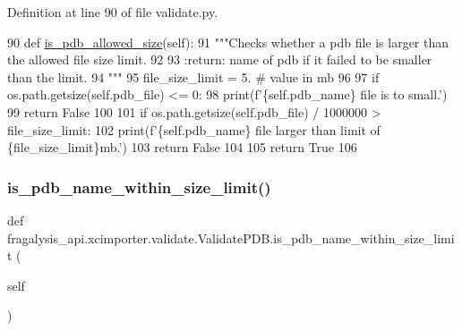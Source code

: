 Definition at line 90 of file validate.\+py.


\begin{DoxyCode}
90     \textcolor{keyword}{def }\hyperlink{classfragalysis__api_1_1xcimporter_1_1validate_1_1_validate_p_d_b_a9e9a8abbb1d90bb2cd17702178831f93}{is\_pdb\_allowed\_size}(self):
91         \textcolor{stringliteral}{"""Checks whether a pdb file is larger than the allowed file size limit.}
92 \textcolor{stringliteral}{}
93 \textcolor{stringliteral}{        :return: name of pdb if it failed to be smaller than the limit.}
94 \textcolor{stringliteral}{        """}
95         file\_size\_limit = 5.  \textcolor{comment}{# value in mb}
96 
97         \textcolor{keywordflow}{if} os.path.getsize(self.pdb\_file) <= 0:
98             print(f\textcolor{stringliteral}{'\{self.pdb\_name\} file is to small.'})
99             \textcolor{keywordflow}{return} \textcolor{keyword}{False}
100 
101         \textcolor{keywordflow}{if} os.path.getsize(self.pdb\_file) / 1000000 > file\_size\_limit:
102             print(f\textcolor{stringliteral}{'\{self.pdb\_name\} file larger than limit of \{file\_size\_limit\}mb.'})
103             \textcolor{keywordflow}{return} \textcolor{keyword}{False}
104 
105         \textcolor{keywordflow}{return} \textcolor{keyword}{True}
106 
\end{DoxyCode}
\mbox{\label{classfragalysis__api_1_1xcimporter_1_1validate_1_1_validate_p_d_b_a23b89548ce5a6619636348c711b7b27e}} 
\subsubsection{\texorpdfstring{is\+\_\+pdb\+\_\+name\+\_\+within\+\_\+size\+\_\+limit()}{is\_pdb\_name\_within\_size\_limit()}}
{\footnotesize\ttfamily def fragalysis\+\_\+api.\+xcimporter.\+validate.\+Validate\+P\+D\+B.\+is\+\_\+pdb\+\_\+name\+\_\+within\+\_\+size\+\_\+limit (\begin{DoxyParamCaption}\item[{}]{self }\end{DoxyParamCaption})}

